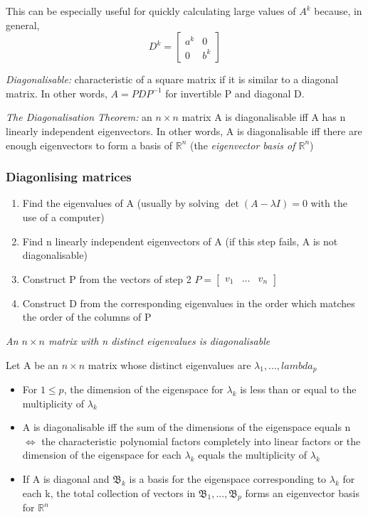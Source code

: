 \documentclass[12pt]{article} %
\newcommand{\R}{\mathbb{R}}
\begin{document}
This can be especially useful for quickly calculating large values of $A^k$ because, in general, 
$$D^k = \begin{bmatrix}
	a^k & 0\\
	0 & b^k
\end{bmatrix}$$

\emph{Diagonalisable:} characteristic of a square matrix if it is similar to a diagonal matrix. In other words, $A = PDP^{-1}$ for invertible P and diagonal D. 

\emph{The Diagonalisation Theorem:} an $n \times n$ matrix A is diagonalisable iff A has n linearly independent eigenvectors. 
In other words, A is diagonalisable iff there are enough eigenvectors to form a basis of $\R^n$ (the \emph{eigenvector basis of $\R^n$})

\subsubsection{Diagonlising matrices}
\begin{enumerate}
	\item Find the eigenvalues of A (usually by solving $\det (A - \lambda I) = 0$ with the use of a computer)
	\item Find n linearly independent eigenvectors of A (if this step fails, A is not diagonalisable)
	\item Construct P from the vectors of step 2 $P = \begin{bmatrix}
		v_1 & ... & v_n
	\end{bmatrix}$
	\item Construct D from the corresponding eigenvalues in the order which matches the order of the columns of P 
\end{enumerate}

\emph{An $n \times n$ matrix with n distinct eigenvalues is diagonalisable}

Let A be an $n \times n$ matrix whose distinct eigenvalues are $\lambda_1, ...,lambda_p$
\begin{itemize}
	\item For $1 \leq p$, the dimension of the eigenspace for $\lambda_k$ is less than or equal to the multiplicity of $\lambda_k$
	\item A is diagonalisable iff the sum of the dimensions of the eigenspace equals n $\iff$ the characteristic polynomial factors completely into linear factors or the dimension of the eigenspace for each $\lambda_k$ equals the multiplicity of $\lambda_k$
	\item If A is diagonal and $\mathfrak{B}_k$ is a basis for the eigenspace corresponding to $\lambda_k$ for each k, the total collection of vectors in $\mathfrak{B}_1, ..., \mathfrak{B}_p$ forms an eigenvector basis for $\R^n$
\end{itemize}
\end{document}
